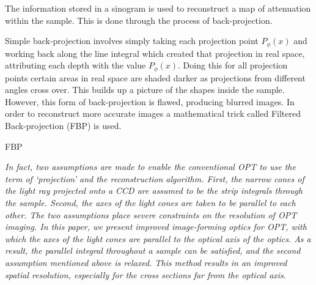 \documentclass[12pt]{article}
\begin{document}
The information stored in a sinogram is used to reconstruct a map of attenuation within the sample. This is done through the process of back-projection.

Simple back-projection involves simply taking each projection point $P_{\phi}(x)$ and working back along the line integral which created that projection in real space,  attributing each depth with the value $P_{\phi}(x)$. Doing this for all projection points certain areas in real space are shaded darker as projections from different angles cross over. This builds up a picture of the shapes inside the sample. However, this form of back-projection is flawed, producing blurred images. In order to reconstruct more accurate images a mathematical trick called Filtered Back-projection (FBP) is used.

FBP









\textit{ In fact, two assumptions are made to enable the conventional OPT to use the term of ‘projection’ and the reconstruction algorithm. First, the narrow cones of the light ray projected onto a CCD are assumed to be the strip integrals through the sample. Second, the axes of the light cones are taken to be parallel to each other. The two assumptions place severe constraints on the resolution of OPT imaging. In this paper, we present improved image-forming optics for OPT, with which the axes of the light cones are parallel to the optical axis of the optics. As a result, the parallel integral throughout a sample can be satisfied, and the second assumption mentioned above is relaxed. This method results in an improved spatial resolution, especially for the cross sections far from the optical axis}. \cite{Wang:2006hy}
\end{document}
